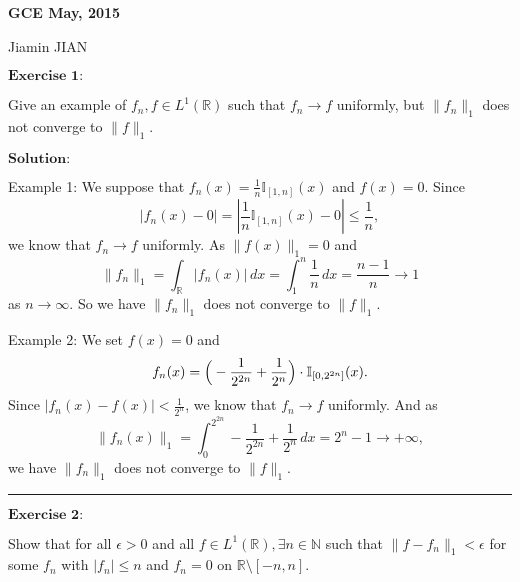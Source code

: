 \documentclass[12pt,a4paper]{ctexart}
\begin{document}
\begin{center}
\textbf{ GCE May, 2015}
\vspace{8pt}

Jiamin JIAN
\end{center}

\vspace{12pt}

$\textbf{Exercise 1:}$

Give an example of $f_{n}, f \in L^{1}(\mathbb{R})$ such that $f_{n} \to f$ uniformly, but $\|f_{n}\|_{1}$ does not converge to $\|f\|_{1}$.


\vspace{8pt}

$\textbf{Solution:}$

Example 1: We suppose that $f_{n}(x) = \frac{1}{n} \mathbb{I}_{[1, n]} (x)$ and $f(x) = 0$. Since
\begin{equation*}
    |f_{n}(x) - 0| = |\frac{1}{n} \mathbb{I}_{[1, n]} (x) - 0| \leq \frac{1}{n},
\end{equation*}
we know that $f_{n} \to f$ uniformly. As $\|f(x)\|_{1} = 0$ and 
\begin{equation*}
    \|f_{n}\|_{1} = \int_{\mathbb{R}}^{} |f_{n}(x)| \, d x = \int_{1}^{n} \frac{1}{n} \, d x = \frac{n-1}{n} \to 1
\end{equation*}
as $n \to \infty$. So we have $\|f_{n}\|_{1}$ does not converge to $\|f\|_{1}$.

Example 2: We set $f(x) = 0$ and 
\begin{equation*}
    f_{n}(x) = \Big{(} - \frac{1}{2^{2n}} + \frac{1}{2^{n}} \Big{)} \cdot \mathbb{I}_{[0, 2^{2n}]} (x).
\end{equation*}
Since $|f_{n}(x) - f(x)| < \frac{1}{2^{n}}$, we know that $f_{n} \to f$ uniformly. And as
\begin{equation*}
    \|f_{n}(x)\|_{1} = \int_{0}^{2^{2n}}  - \frac{1}{2^{2n}} + \frac{1}{2^{n}} \, d x = 2^{n} - 1 \to + \infty,
\end{equation*}
we have $\|f_{n}\|_{1}$ does not converge to $\|f\|_{1}$.


\noindent\rule[0.25\baselineskip]{\textwidth}{0.5pt}

\vspace{8pt}

$\textbf{Exercise 2:}$

Show that for all $\epsilon > 0$ and all $f \in L^{1}(\mathbb{R}), \exists n \in \mathbb{N}$ such that $\|f - f_{n}\|_{1} < \epsilon$ for some $f_{n}$ with $|f_{n}| \leq n$ and $f_{n} = 0$ on $\mathbb{R} \setminus [-n, n]$.
 
\end{document}
